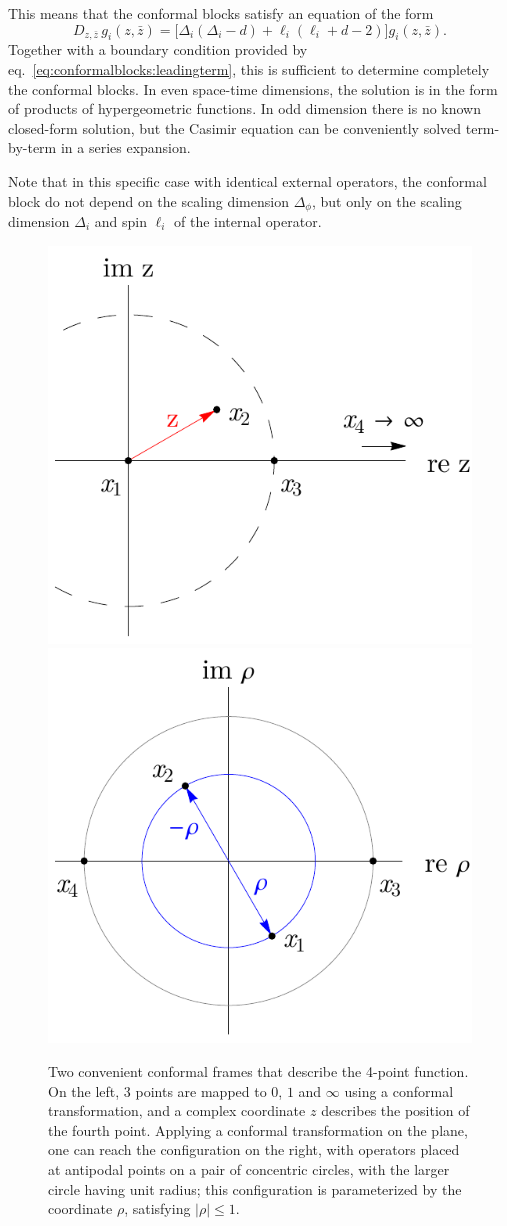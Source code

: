 \documentclass[a4paper,12pt]{article}
\numberwithin{equation}{section}
\begin{document}
This means that the conformal blocks satisfy an equation of the form
\begin{equation}
	D_{z, \bar{z}} \, g_i(z, \bar{z})
	= \big[ \Delta_i (\Delta_i - d) + \ell_i (\ell_i + d - 2) \big]
	g_i(z, \bar{z}).
\end{equation}
Together with a boundary condition provided by  eq.~\eqref{eq:conformalblocks:leadingterm}, this is sufficient to determine completely the conformal blocks. In even space-time dimensions, the solution is in the form of products of hypergeometric functions. In odd dimension there is no known closed-form solution, but the Casimir equation can be conveniently solved term-by-term in a series expansion.

Note that in this specific case with identical external operators, the conformal block do not depend on the scaling dimension $\Delta_\phi$, but only on the scaling dimension $\Delta_i$ and spin $\ell_i$ of the internal operator.

\begin{figure}
	\includegraphics[width=0.47\linewidth]{figures/z-plane.pdf}
	\hfill
	\includegraphics[width=0.47\linewidth]{figures/rho-plane.pdf}
	\caption{Two convenient conformal frames
	that describe the 4-point function.
	On the left, 3 points are mapped to $0$, $1$ and $\infty$
	using a conformal transformation, and a complex coordinate
	$z$ describes the position of the fourth point.
	Applying a conformal transformation on the plane,
	one can reach the configuration on the right, with operators
	placed at antipodal points on a pair of concentric circles,
	with the larger circle having unit radius; this configuration
	is parameterized by the coordinate $\rho$,
	satisfying $\left| \rho \right| \leq 1$.}
	\label{fig:conformalframes}
\end{figure}
\end{document}
